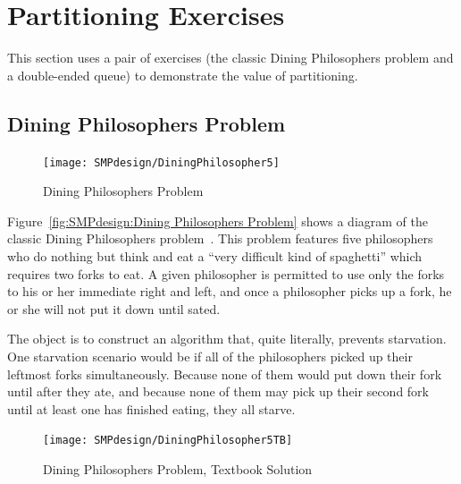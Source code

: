
\section{Partitioning Exercises}
\label{sec:SMPdesign:Partitioning Exercises}

This section uses a pair of exercises (the classic Dining Philosophers
problem and a double-ended queue) to demonstrate the value of partitioning.

\subsection{Dining Philosophers Problem}
\label{sec:SMPdesign:Dining Philosophers Problem}

\begin{figure}[tb]
\begin{center}
\texttt{[image: SMPdesign/DiningPhilosopher5]}
\end{center}
\caption{Dining Philosophers Problem}
\end{figure}

Figure~\ref{fig:SMPdesign:Dining Philosophers Problem} shows a diagram
of the classic Dining Philosophers problem~\cite{Dijkstra1971HOoSP}.
This problem features five philosophers who do nothing but think and
eat a ``very difficult kind of spaghetti'' which requires two forks
to eat.
A given philosopher is permitted to use only the forks to his or her
immediate right and left, and once a philosopher picks up a fork,
he or she will not put it down until sated.

The object is to construct an algorithm that, quite literally,
prevents starvation.
One starvation scenario would be if all of the philosophers picked up
their leftmost forks simultaneously.
Because none of them would put down their fork until after they ate,
and because none of them may pick up their second fork until at least
one has finished eating, they all starve.

\begin{figure}[tb]
\begin{center}
\texttt{[image: SMPdesign/DiningPhilosopher5TB]}
\end{center}
\caption{Dining Philosophers Problem, Textbook Solution}
\end{figure}

